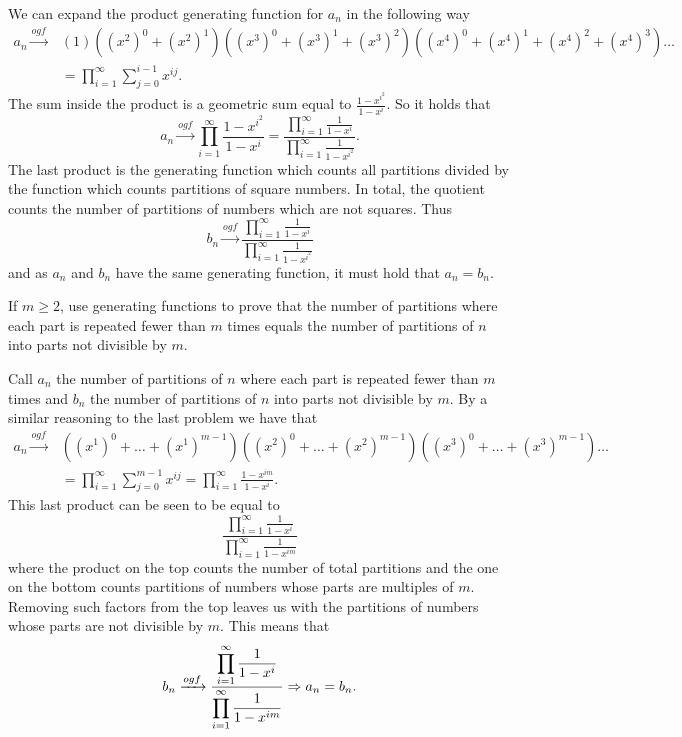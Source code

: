 \documentclass[12pt]{memoir}
\begin{document}
\begin{ptcbr}
    We can expand the product generating function for $a_n$ in the following way 
    \begin{align*}
        a_n\xrightarrow[]{ogf}&(1)((x^2)^0+(x^2)^1)((x^3)^0+(x^3)^1+(x^3)^2)((x^4)^0+(x^4)^1+(x^4)^2+(x^4)^3)\dots\\
        &=\prod_{i=1}^\infty\sum_{j=0}^{i-1}x^{ij}.
    \end{align*}
    The sum inside the product is a geometric sum equal to $\frac{1-x^{i^2}}{1-x^i}$. So it holds that 
    $$\displaystyle a_n\xrightarrow[]{ogf}\prod_{i=1}^\infty\frac{1-x^{i^2}}{1-x^i}=\frac{\displaystyle \prod_{i=1}^\infty\frac{1}{1-x^i}}{\displaystyle \prod_{i=1}^\infty\frac{1}{1-x^{i^2}}}.$$
    The last product is the generating function which counts all partitions divided by the function which counts partitions of square numbers. In total, the quotient counts the number of partitions of numbers which are not squares. Thus 
    $$b_n\xrightarrow[]{ogf}\frac{\displaystyle \prod_{i=1}^\infty\frac{1}{1-x^i}}{\displaystyle \prod_{i=1}^\infty\frac{1}{1-x^{i^2}}}$$ 
    and as $a_n$ and $b_n$ have the same generating function, it must hold that $a_n=b_n$.
\end{ptcbr}
\newpage
\begin{Ej}
    If $m\geq 2$, use generating functions to prove that the number of partitions where each part is repeated fewer than $m$ times equals the number of partitions of $n$ into parts not divisible by $m$. 
\end{Ej}

\begin{ptcbr}
    Call $a_n$ the number of partitions of $n$ where each part is repeated fewer than $m$ times and $b_n$ the number of partitions of $n$ into parts not divisible by $m$. By a similar reasoning to the last problem we have that 
  \begin{align*}
    a_n\xrightarrow[]{ogf}&((x^1)^0+\dots+(x^1)^{m-1})((x^2)^0+\dots+(x^2)^{m-1})((x^3)^0+\dots+(x^3)^{m-1})\dots\\
    &=\prod_{i=1}^\infty\sum_{j=0}^{m-1}x^{ij}=\prod_{i=1}^\infty\frac{1-x^{im}}{1-x^i}.
  \end{align*}
  This last product can be seen to be equal to 
  $$\frac{\displaystyle \prod_{i=1}^\infty\frac{1}{1-x^i}}{\displaystyle \prod_{i=1}^\infty\frac{1}{1-x^{im}}}$$
  where the product on the top counts the number of total partitions and the one on the bottom counts partitions of numbers whose parts are multiples of $m$. Removing such factors from the top leaves us with the partitions of numbers whose parts are not divisible by $m$. This means that 
  $$b_n\xrightarrow[]{ogf}\frac{\displaystyle \prod_{i=1}^\infty\frac{1}{1-x^i}}{\displaystyle \prod_{i=1}^\infty\frac{1}{1-x^{im}}}\Rightarrow a_n=b_n.$$
\end{ptcbr}
\end{document}
